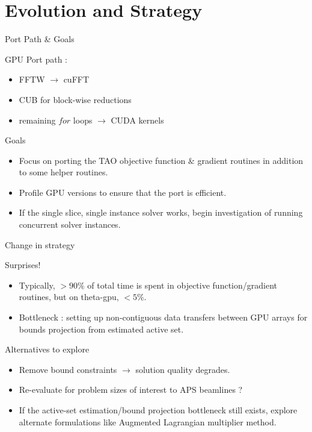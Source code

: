 \documentclass{beamer}
\begin{document}
\section{Evolution and Strategy}
\begin{frame}{Port Path \& Goals }
	\begin{block}{GPU Port path : }
		\begin{itemize}
			\item FFTW $\rightarrow$ cuFFT 
			\item CUB for block-wise reductions
			\item remaining $for$ loops $\rightarrow$ CUDA kernels
		\end{itemize}
	\end{block}
    \begin{exampleblock}{Goals}
	  \begin{itemize}
		\item Focus on porting the TAO objective function $\&$ gradient routines in addition to some helper routines.
		\item Profile GPU versions to ensure that the port is efficient.
		\item If the single slice, single instance solver works, begin investigation of running concurrent solver instances.
      \end{itemize}
    \end{exampleblock}
\end{frame}

\begin{frame}{Change in strategy}
  \begin{block}{Surprises!}
	\begin{itemize}
		\item Typically, $>90\%$ of total time is spent in objective function/gradient routines, but on theta-gpu, $<5\%$.
		\item Bottleneck : setting up non-contiguous data transfers between GPU arrays for bounds projection from estimated active set.
    \end{itemize}
  \end{block}	
  \begin{exampleblock}{Alternatives to explore}
    \begin{itemize}
      \item Remove bound constraints $\rightarrow$ solution quality degrades.
      \item Re-evaluate for problem sizes of interest to APS beamlines ?
      \item If the active-set estimation/bound projection bottleneck still exists, explore alternate formulations like Augmented Lagrangian multiplier method.
   \end{itemize}
  \end{exampleblock}
\end{frame}
\end{document}
